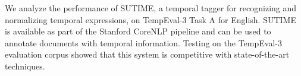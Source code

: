 We analyze the performance of SUTIME, a temporal tagger for recognizing and normalizing temporal expressions, on TempEval-3 Task A for English. SUTIME is
 available as part of the Stanford CoreNLP pipeline and can be used to annotate
 documents with temporal information. Testing on the TempEval-3 evaluation
 corpus showed that this system is competitive with state-of-the-art techniques.

